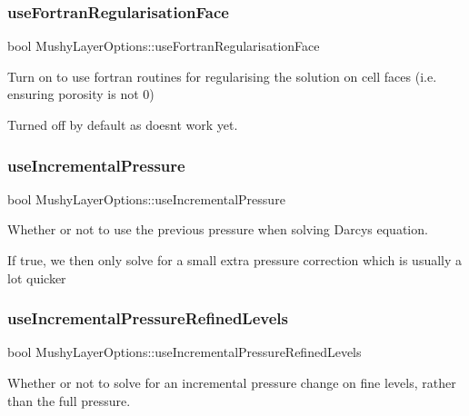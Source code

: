 \subsubsection{\texorpdfstring{use\+Fortran\+Regularisation\+Face}{useFortranRegularisationFace}}
{\footnotesize\ttfamily bool Mushy\+Layer\+Options\+::use\+Fortran\+Regularisation\+Face}



Turn on to use fortran routines for regularising the solution on cell faces (i.\+e. ensuring porosity is not 0) 

Turned off by default as doesn\textquotesingle{}t work yet. \mbox{\label{struct_mushy_layer_options_a0ee4602f8acbf255e32a89397409a67c}} 
\subsubsection{\texorpdfstring{use\+Incremental\+Pressure}{useIncrementalPressure}}
{\footnotesize\ttfamily bool Mushy\+Layer\+Options\+::use\+Incremental\+Pressure}



Whether or not to use the previous pressure when solving Darcy\textquotesingle{}s equation. 

If true, we then only solve for a small extra pressure correction which is usually a lot quicker \mbox{\label{struct_mushy_layer_options_a58be59c481f1d2f2283b943c723cb73f}} 
\subsubsection{\texorpdfstring{use\+Incremental\+Pressure\+Refined\+Levels}{useIncrementalPressureRefinedLevels}}
{\footnotesize\ttfamily bool Mushy\+Layer\+Options\+::use\+Incremental\+Pressure\+Refined\+Levels}



Whether or not to solve for an incremental pressure change on fine levels, rather than the full pressure. 

